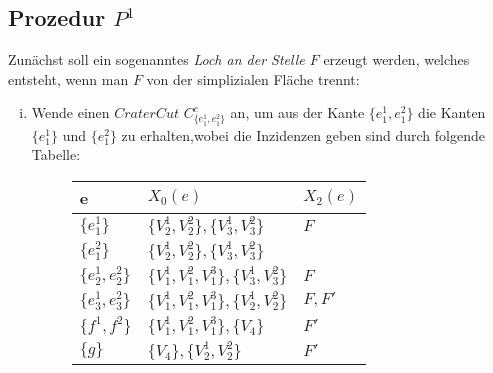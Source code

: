 \documentclass[12pt,titlepage]{article}
\begin{document}
\subsection{Prozedur $P^1$}
 Zunächst soll ein sogenanntes \emph{Loch an der Stelle $F$} erzeugt werden, welches entsteht, wenn man $F$ von der simplizialen Fläche trennt:
\begin{enumerate}[(i)]
\item Wende einen $Crater Cut$ $C^{c}_{\{e_{1}^1,e_{1}^2\}}$ an, um aus der Kante $\{e_{1}^1,e_{1}^2\}$ die Kanten $\{e_1^1\}$ und $\{e_1^2\}$ zu erhalten,wobei
die Inzidenzen geben sind durch folgende Tabelle:
\begin{figure}[H]
\begin{center}
\begin{tabularx}{\textwidth}{XXX}
\hline
\textbf{e}&\textbf{$X_0(e)$}&\textbf{$X_2(e)$}\\
 \hline
 $\{e_1^1\}$ & $\{V_2^1,V_2^2\},\{V_3^1,V_3^2\}$& $F$\\
  $\{e_1^2\}$ & $\{V_2^1,V_2^2\},\{V_3^1,V_3^2\}$&\\ 
  $\{e_2^1,e_2^2\}$&$\{V_1^1,V_1^2,V_1^3\},\{V_3^1,V_3^2\}$ & $F$\\
  $\{e_3^1,e_3^2\}$&$\{V_1^1,V_1^2,V_1^3\},\{V_2^1,V_2^2\}$ & $F,F'$\\ 
   $\{f^1,f^2\}$&$\{V_1^1,V_1^2,V_1^3\},\{V_4\}$& $F'$\\
   $\{g\}$ & $\{V_4\},\{V_2^1,V_2^2\}$ & $F'$ \\


\end{tabularx}
\end{center}
\end{figure}
\end{enumerate}
\end{document}
